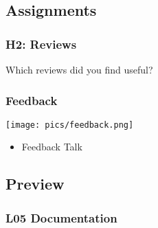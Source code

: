 
\breakframe





\subsection{Assignments}

\begin{assignment}
	\frametitle{H2: Reviews}

	\begin{task}
	Which reviews did you find useful?
	\end{task}
\end{assignment}

\begin{frame}
	\frametitle{Feedback}

	\hfill \texttt{[image: pics/feedback.png]}
	\vspace{-1cm}
	\begin{itemize}
		\item Feedback Talk
	\end{itemize}
\end{frame}

\subsection{Preview}

\begin{frame}
	\frametitle{L05 Documentation}
\end{frame}



